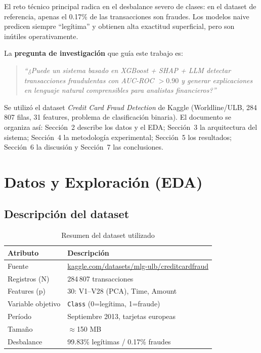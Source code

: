 \documentclass[10pt,twocolumn]{article}
\begin{document}
El reto técnico principal radica en el desbalance severo de clases:
en el dataset de referencia, apenas el 0.17\% de las transacciones
son fraudes. Los modelos naive predicen siempre ``legítima'' y obtienen
alta exactitud superficial, pero son inútiles operativamente.

La \textbf{pregunta de investigación} que guía este trabajo es:

\begin{quote}
  \textit{``¿Puede un sistema basado en XGBoost + SHAP + LLM detectar
  transacciones fraudulentas con AUC-ROC $> 0.90$ y generar
  explicaciones en lenguaje natural comprensibles para analistas
  financieros?''}
\end{quote}

Se utilizó el dataset \textit{Credit Card Fraud Detection} de Kaggle
(Worldline/ULB, 284\,807 filas, 31 features, problema de clasificación
binaria). El documento se organiza así: Sección~2 describe los datos y
el EDA; Sección~3 la arquitectura del sistema; Sección~4 la
metodología experimental; Sección~5 los resultados; Sección~6 la
discusión y Sección~7 las conclusiones.

\section{Datos y Exploración (EDA)}

\subsection{Descripción del dataset}

\begin{table}[H]
\centering
\caption{Resumen del dataset utilizado}
\label{tab:dataset}
\begin{tabularx}{\columnwidth}{lX}
\toprule
\textbf{Atributo} & \textbf{Descripción} \\
\midrule
Fuente & \url{kaggle.com/datasets/mlg-ulb/creditcardfraud} \\
Registros (N) & 284\,807 transacciones \\
Features (p) & 30: V1--V28 (PCA), Time, Amount \\
Variable objetivo & \texttt{Class} (0=legítima, 1=fraude) \\
Período & Septiembre 2013, tarjetas europeas \\
Tamaño & $\approx$150 MB \\
Desbalance & 99.83\% legítimas / 0.17\% fraudes \\
\bottomrule
\end{tabularx}
\end{table}
\end{document}
